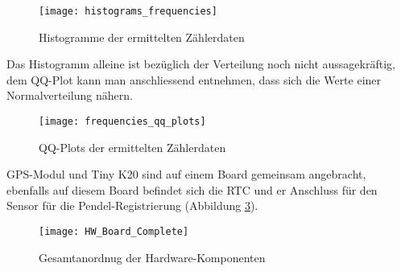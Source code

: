 	\begin{figure}[H]
		\centering
		\texttt{[image: histograms\_frequencies]}
		\caption{Histogramme der ermittelten Zählerdaten}
		\label{fig:freq_histograms}
	\end{figure}
	Das Histogramm alleine ist bezüglich der Verteilung noch nicht aussagekräftig, dem QQ-Plot kann man anschliessend entnehmen, dass sich die Werte einer Normalverteilung nähern.
	\begin{figure}[H]
		\centering
		\texttt{[image: frequencies\_qq\_plots]}
		\caption{QQ-Plots der ermittelten Zählerdaten}
		\label{fig:freq_qq_plot}
	\end{figure}
GPS-Modul und Tiny K20 sind auf einem Board gemeinsam angebracht, ebenfalls auf diesem Board befindet sich die RTC und er Anschluss für den Sensor für die Pendel-Registrierung (Abbildung \ref{fig:hardware_board}).
	\begin{figure}[H]
		\centering
		\texttt{[image: HW\_Board\_Complete]}
		\caption{Gesamtanordnug der Hardware-Komponenten}
		\label{fig:hardware_board}
	\end{figure}